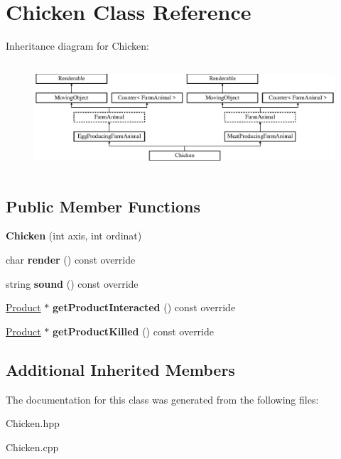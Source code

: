 \hypertarget{class_chicken}{}\section{Chicken Class Reference}
\label{class_chicken}
Inheritance diagram for Chicken\+:\begin{figure}[H]
\begin{center}
\leavevmode
\includegraphics[height=4.046243cm]{class_chicken}
\end{center}
\end{figure}
\subsection*{Public Member Functions}
\begin{DoxyCompactItemize}
\item 
\mbox{\label{class_chicken_a250089acc3fd5c652ddd2eac7ce1ebd4}} 
{\bfseries Chicken} (int axis, int ordinat)
\item 
\mbox{\label{class_chicken_a70b47acc255594170013d22b7ddc380a}} 
char {\bfseries render} () const override
\item 
\mbox{\label{class_chicken_a02ca558beb853b846e0d62d17cdeeb0a}} 
string {\bfseries sound} () const override
\item 
\mbox{\label{class_chicken_a21fa75acec321d0b450a49a76c485a42}} 
\mbox{\hyperlink{class_product}{Product}} $\ast$ {\bfseries get\+Product\+Interacted} () const override
\item 
\mbox{\label{class_chicken_adc5e24e4fe9a5ba2b2933e541b0c92f4}} 
\mbox{\hyperlink{class_product}{Product}} $\ast$ {\bfseries get\+Product\+Killed} () const override
\end{DoxyCompactItemize}
\subsection*{Additional Inherited Members}


The documentation for this class was generated from the following files\+:\begin{DoxyCompactItemize}
\item 
Chicken.\+hpp\item 
Chicken.\+cpp\end{DoxyCompactItemize}
